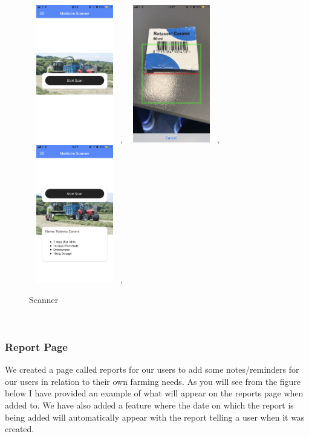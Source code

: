 \documentclass[12pt,a4paper,oneside,openany]{book}
\begin{document}
\begin{figure}[ht]
\renewcommand\thefigure{5.18}
\centering
\includegraphics[width=4cm,height=6cm]{Images/scan1.png},
\includegraphics[width=4cm,height=6cm]{Images/scan3.png},
\includegraphics[width=4cm,height=6cm]{Images/scan2.png},
\caption{Scanner}
\label{feed}
\end{figure}

\\

\subsubsection{Report Page}
We created a page called reports for our users to add some notes/reminders for our users in relation to their own farming needs. As you will see from the figure below I have provided an example of what will appear on the reports page when added to. 
We have also added a feature where the date on which the report is being added will automatically appear with the report telling a user when it was created.
\end{document}
